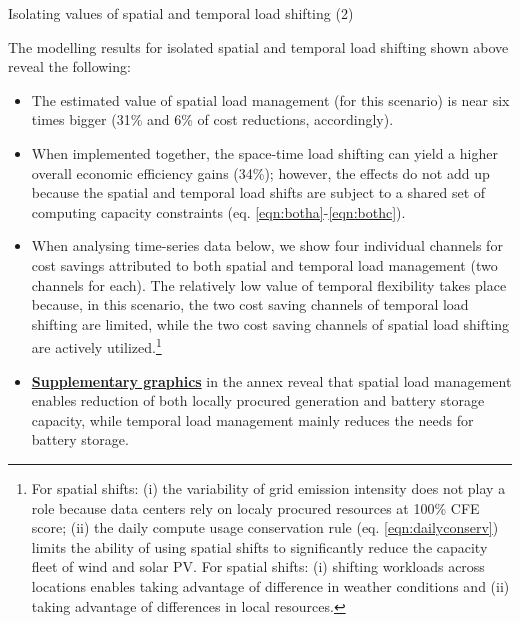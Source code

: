 \begin{frame}{Isolating values of spatial and temporal load shifting (2)}

  {\footnotesize 

  The modelling results for isolated spatial and temporal load shifting shown above reveal the following: \\

  \begin{itemize}

    \item The estimated value of spatial load management (for this scenario) is near \alert{six times bigger} (31\% and 6\% of cost reductions, accordingly). 

    \item When implemented together, the space-time load shifting can yield a higher overall economic efficiency gains (34\%); however, \alert{the effects do not add up} because the spatial and temporal load shifts are subject to a shared set of computing capacity constraints (eq. \ref{eqn:botha}-\ref{eqn:bothc}).

    \item When analysing time-series data below, we show four individual channels for cost savings attributed to both spatial and temporal load management (two channels for each). The relatively low value of temporal flexibility takes place because, in this scenario, the two cost saving channels of temporal load shifting are limited, while the two cost saving channels of spatial load shifting are actively utilized.\footnote{{\scriptsize For spatial shifts: (i) the variability of grid emission intensity does not play a role because data centers rely on localy procured resources at 100\% CFE score; (ii) the daily compute usage conservation rule (eq. \ref{eqn:dailyconserv}) limits the ability of using spatial shifts to significantly reduce the capacity fleet of wind and solar PV. For spatial shifts: (i) shifting workloads across locations enables taking advantage of difference in weather conditions and  (ii) taking advantage of differences in local resources.}}

    \item {\bf \hyperlink{isolated_spatial_cfe100_p1}{Supplementary graphics}} in the annex reveal that spatial load management enables reduction of both locally procured generation and battery storage capacity, while temporal load management mainly reduces the needs for battery storage.\\ \vspace{0.3cm}
    

  \end{itemize}
  }
\end{frame}


